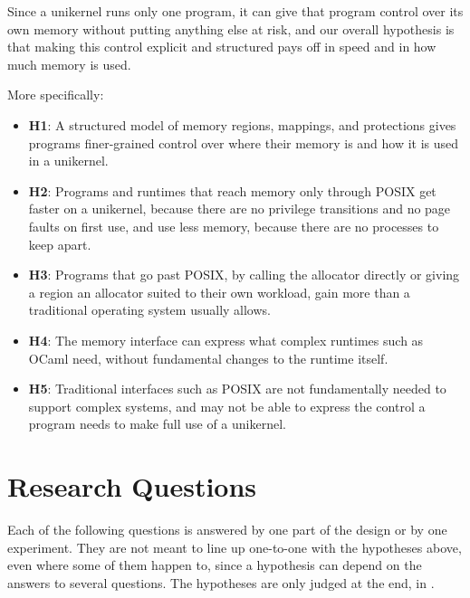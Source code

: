 \documentclass[12pt]{report}
\newcommand{\fullref}[1]{\Cref{#1}}
\newcommand{\hypothesis}[1]{\textbf{#1}}
\renewcommand{\_}{\origunderscore\allowbreak}
\begin{document}
Since a unikernel runs only one program, it can give that program control over its own memory without putting anything else at risk, and our overall hypothesis is that making this control explicit and structured pays off in speed and in how much memory is used.

More specifically:
\begin{itemize}
	\item \hypothesis{H1}: A structured model of memory regions, mappings, and protections gives programs finer-grained control over where their memory is and how it is used in a unikernel.

	\item \hypothesis{H2}: Programs and runtimes that reach memory only through POSIX get faster on a unikernel, because there are no privilege transitions and no page faults on first use, and use less memory, because there are no processes to keep apart.

	\item \hypothesis{H3}: Programs that go past POSIX, by calling the allocator directly or giving a region an allocator suited to their own workload, gain more than a traditional operating system usually allows.

	\item \hypothesis{H4}: The memory interface can express what complex runtimes such as OCaml need, without fundamental changes to the runtime itself.

	\item \hypothesis{H5}: Traditional interfaces such as POSIX are not fundamentally needed to support complex systems, and may not be able to express the control a program needs to make full use of a unikernel.
\end{itemize}

\section{Research Questions}
Each of the following questions is answered by one part of the design or by one experiment. They are not meant to line up one-to-one with the hypotheses above, even where some of them happen to, since a hypothesis can depend on the answers to several questions. The hypotheses are only judged at the end, in \fullref{sec:hypothesis-verdicts}.
\end{document}
